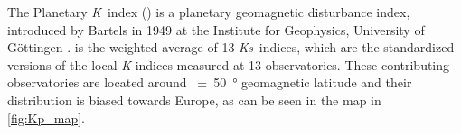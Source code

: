 The Planetary \textit{K}~index (\Kp{}) is a planetary geomagnetic disturbance index, introduced by Bartels in 1949 at the Institute for Geophysics, University of Göttingen \citep{Bartels1949}. \Kp{} is the weighted average of 13 \textit{Ks}~indices, which are the standardized versions of the local \textit{K} indices measured at 13 observatories. These contributing observatories are located around \SI{+-50}{\degree} geomagnetic latitude and their distribution is biased towards Europe, as can be seen in the map in \autoref{fig:Kp_map}.
\begin{figure}[htb]
\end{figure}

